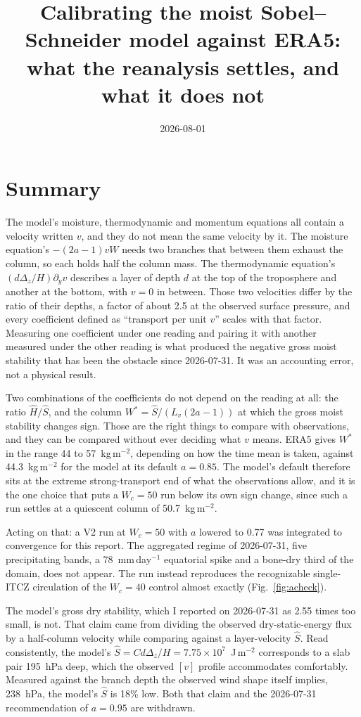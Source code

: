 \documentclass[11pt]{article}
\title{Calibrating the moist Sobel--Schneider model against ERA5:\\
what the reanalysis settles, and what it does not}
\date{2026-08-01}
\newcommand{\py}{\partial_y}
\newcommand{\Shat}{\hat S}
\newcommand{\Hhat}{\hat H}
\newcommand{\Wstar}{W^*}
\begin{document}
\maketitle

\section*{Summary}

The model's moisture, thermodynamic and momentum equations all contain a
velocity written $v$, and they do not mean the same velocity by it. The
moisture equation's $-(2a{-}1)vW$ needs two branches that between them exhaust
the column, so each holds half the column mass. The thermodynamic equation's
$(d\Delta_z/H)\py v$ describes a layer of depth $d$ at the top of the
troposphere and another at the bottom, with $v=0$ in between. Those two
velocities differ by the ratio of their depths, a factor of about 2.5 at the
observed surface pressure, and every coefficient defined as ``transport per
unit $v$'' scales with that factor. Measuring one coefficient under one reading
and pairing it with another measured under the other reading is what produced
the negative gross moist stability that has been the obstacle since 2026-07-31.
It was an accounting error, not a physical result.

Two combinations of the coefficients do not depend on the reading at all:
the ratio $\Hhat/\Shat$, and the column
$\Wstar = \Shat/(L_v(2a{-}1))$ at which the gross moist stability changes sign.
Those are the right things to compare with observations, and they can be
compared without ever deciding what $v$ means.
ERA5 gives $\Wstar$ in the range 44 to 57~kg\,m$^{-2}$, depending on how the
time mean is taken, against 44.3~kg\,m$^{-2}$ for the model at its default
$a=0.85$. The model's default therefore sits at the extreme
strong-transport end of what the observations allow, and it is the one choice
that puts a $W_c = 50$ run below its own sign change, since such a run settles
at a quiescent column of 50.7~kg\,m$^{-2}$.

Acting on that: a V2 run at $W_c=50$ with $a$ lowered to 0.77 was integrated to
convergence for this report. The aggregated regime of 2026-07-31, five
precipitating bands, a 78~mm\,day$^{-1}$ equatorial spike and a bone-dry third
of the domain, does not appear. The run instead reproduces the recognizable
single-ITCZ circulation of the $W_c=40$ control almost exactly
(Fig.~\ref{fig:acheck}).

The model's gross dry stability, which I reported on 2026-07-31 as 2.55 times
too small, is not. That claim came from dividing the observed dry-static-energy
flux by a half-column velocity while comparing against a layer-velocity
$\Shat$. Read consistently, the model's $\Shat = Cd\Delta_z/H = 7.75\times
10^{7}$~J\,m$^{-2}$ corresponds to a slab pair 195~hPa deep, which the observed
$[v]$ profile accommodates comfortably. Measured against the branch depth the
observed wind shape itself implies, 238~hPa, the model's $\Shat$ is 18\% low.
Both that claim and the 2026-07-31 recommendation of $a=0.95$ are withdrawn.
\end{document}
